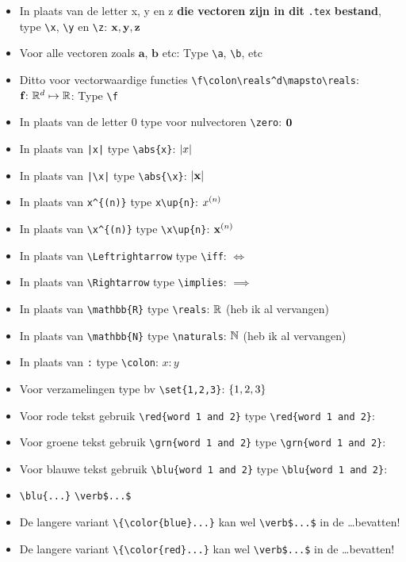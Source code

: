 \documentclass{2wa40summary}
\begin{document}
	\begin{itemize}
		\item In plaats van de letter x, y en z \textbf{die vectoren zijn in dit} \verb$.tex$ \textbf{bestand}, type
		\verb$\x$, \verb$\y$ en \verb$\z$: ${\textbf{x}}, {\textbf{y}}, {\textbf{z}}$
		\item Voor alle vectoren zoals $\mathbf{a}$, $\mathbf{b}$ etc: Type \verb$\a$, \verb$\b$, etc
		\item Ditto voor vectorwaardige functies \verb$\f\colon\reals^d\mapsto\reals$: ${\textbf{f}}\colon\mathbb{R}^d\mapsto\mathbb{R}$: Type \verb$\f$
		\item In plaats van de letter 0 type voor nulvectoren \verb$\zero$: ${\textbf{0}}$
		\item In plaats van \verb$|x|$ type \verb$\abs{x}$: ${\left|x\right|}$
		\item In plaats van \verb$|\x|$ type \verb$\abs{\x}$: ${\left|{\textbf{x}}\right|}$
		\item In plaats van \verb$x^{(n)}$ type \verb$x\up{n}$: $x^{(n)}$
		\item In plaats van \verb$\x^{(n)}$ type \verb$\x\up{n}$: ${\textbf{x}}^{(n)}$
		\item In plaats van \verb$\Leftrightarrow$ type \verb$\iff$: $\iff$
		\item In plaats van \verb$\Rightarrow$ type \verb$\implies$: $\implies$
		\item In plaats van \verb$\mathbb{R}$ type \verb$\reals$: $\mathbb{R}$ (heb ik al vervangen)
		\item In plaats van \verb$\mathbb{N}$ type \verb$\naturals$: $\mathbb{N}$ (heb ik al vervangen)
		\item In plaats van \verb$:$ type \verb$\colon$: $x\colon y$
		\item Voor verzamelingen type bv \verb$\set{1,2,3}$: $\lbrace1,2,3\rbrace$
		\item Voor rode tekst gebruik \verb$$ type \verb$\red{word 1 and 2}$: \red{word 1 and 2}
		\item Voor groene tekst gebruik \verb$$ type \verb$\grn{word 1 and 2}$: \grn{word 1 and 2}
		\item Voor blauwe tekst gebruik \verb$$ type \verb$\blu{word 1 and 2}$: \blu{word 1 and 2}
		\item {} \verb$\blu{...}$  \verb#\verb$...$# 
		\item De langere variant \verb$\{\color{blue}...}$ kan wel \verb#\verb$...$# in de \dots bevatten!
		\item De langere variant \verb$\{\color{red}...}$ kan wel \verb#\verb$...$# in de \dots bevatten!

\end{itemize}
\end{document}
